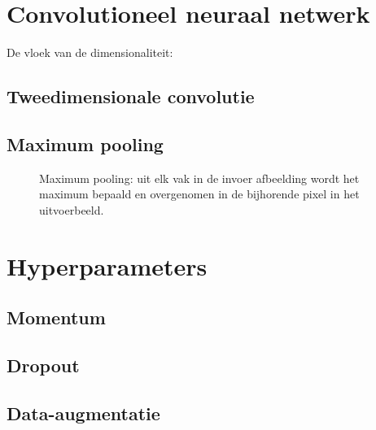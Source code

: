 \section{Convolutioneel neuraal netwerk}
De vloek van de dimensionaliteit: 
\subsection{Tweedimensionale convolutie}
\subsection{Maximum pooling}
\begin{figure}
	\centering
	
	\caption{Maximum pooling: uit elk vak in de invoer afbeelding wordt het maximum bepaald en overgenomen in de bijhorende pixel in het uitvoerbeeld.}
	\label{max-poolingl}
\end{figure}

\section{Hyperparameters}
\subsection{Momentum}
\subsection{Dropout}\label{sec:dropout}


\cite{dropout}
\subsection{Data-augmentatie}\label{sec:data-augm}